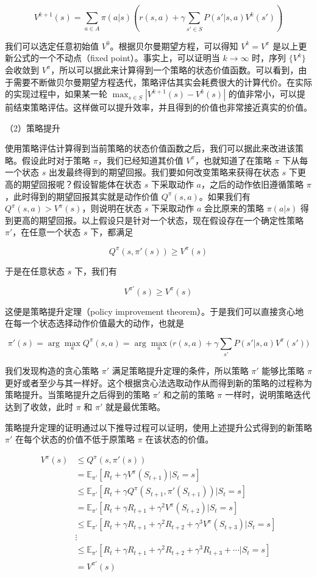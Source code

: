 \[
V^{k+1}(s)=\sum_{a\in A}\pi(a|s)(r(s,a)+\gamma\sum_{s'\in S}P(s'|s,a)V^{k}(s'))
\]

我们可以选定任意初始值 \(V^{0}\)。根据贝尔曼期望方程，可以得知 \(V^{k}=V^{\pi}\) 是以上更新公式的一个不动点（fixed point）。事实上，可以证明当 \(k\to\infty\) 时，序列 \(\{V^{k}\}\) 会收敛到 \(V^{\pi}\)，所以可以据此来计算得到一个策略的状态价值函数。可以看到，由于需要不断做贝尔曼期望方程迭代，策略评估其实会耗费很大的计算代价。在实际的实现过程中，如果某一轮 \(\max_{s\in S}|V^{k+1}(s)-V^{k}(s)|\) 的值非常小，可以提前结束策略评估。这样做可以提升效率，并且得到的价值也非常接近真实的价值。

（2）策略提升

使用策略评估计算得到当前策略的状态价值函数之后，我们可以据此来改进该策略。假设此时对于策略 \(\pi\)，我们已经知道其价值 \(V^{\pi}\)，也就知道了在策略 \(\pi\) 下从每一个状态 \(s\) 出发最终得到的期望回报。我们要如何改变策略来获得在状态 \(s\) 下更高的期望回报呢？假设智能体在状态 \(s\) 下采取动作 \(a\)，之后的动作依旧遵循策略 \(\pi\)，此时得到的期望回报其实就是动作价值 \(Q^{\pi}(s,a)\)。如果我们有 \(Q^{\pi}(s,a)>V^{\pi}(s)\)，则说明在状态 \(s\) 下采取动作 \(a\) 会比原来的策略 \(\pi(a|s)\) 得到更高的期望回报。以上假设只是针对一个状态，现在假设存在一个确定性策略 \(\pi'\)，在任意一个状态 \(s\) 下，都满足

\[
Q^{\pi}(s,\pi'(s))\ge V^{\pi}(s)
\]

于是在任意状态 \(s\) 下，我们有

\[
V^{\pi'}(s)\ge V^{\pi}(s)
\]

这便是策略提升定理（policy improvement theorem）。于是我们可以直接贪心地在每一个状态选择动作价值最大的动作，也就是

\[
\pi'(s)=\arg\max_a Q^{\pi}(s,a)=\arg\max_a\bigl(r(s,a)+\gamma\sum_{s'}P(s'|s,a)V^{\pi}(s')\bigr)
\]

我们发现构造的贪心策略 \(\pi'\) 满足策略提升定理的条件，所以策略 \(\pi'\) 能够比策略 \(\pi\) 更好或者至少与其一样好。这个根据贪心法选取动作从而得到新的策略的过程称为策略提升。当策略提升之后得到的策略 \(\pi'\) 和之前的策略 \(\pi\) 一样时，说明策略迭代达到了收敛，此时 \(\pi\) 和 \(\pi'\) 就是最优策略。

策略提升定理的证明通过以下推导过程可以证明，使用上述提升公式得到的新策略 \(\pi'\) 在每个状态的价值不低于原策略 \(\pi\) 在该状态的价值。

\[
\begin{aligned}
V^{\pi}(s) &\le Q^{\pi}(s,\pi'(s))\\
&= \mathbb{E}_{\pi'}[R_t+\gamma V^{\pi}(S_{t+1})|S_t=s]\\
&\le \mathbb{E}_{\pi'}[R_t+\gamma Q^{\pi}(S_{t+1},\pi'(S_{t+1}))|S_t=s]\\
&= \mathbb{E}_{\pi'}[R_t+\gamma R_{t+1}+\gamma^{2}V^{\pi}(S_{t+2})|S_t=s]\\
&\le \mathbb{E}_{\pi'}[R_t+\gamma R_{t+1}+\gamma^{2}R_{t+2}+\gamma^{3}V^{\pi}(S_{t+3})|S_t=s]\\
&\vdots\\
&\le \mathbb{E}_{\pi'}[R_t+\gamma R_{t+1}+\gamma^{2}R_{t+2}+\gamma^{3}R_{t+3}+\cdots|S_t=s]\\
&= V^{\pi'}(s)
\end{aligned}
\]

